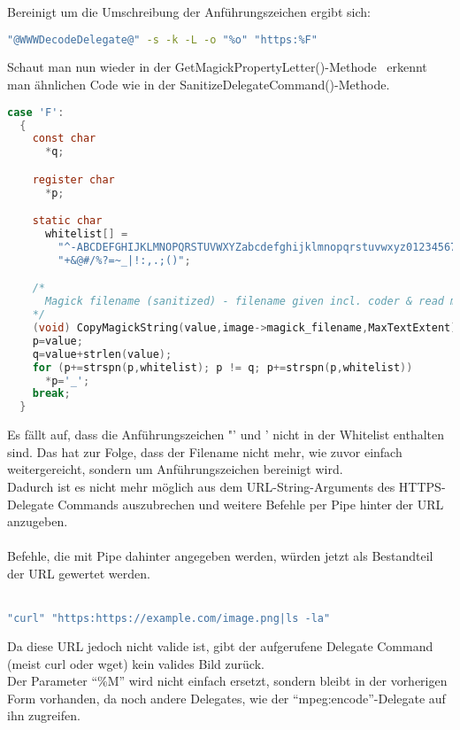 Bereinigt um die Umschreibung der Anführungszeichen ergibt sich:\\

\begin{lstlisting}[firstnumber=1, language=Bash, caption=Aufgelöster https-Delegate-Befehl 6.9.3-10,label={lst:lstlisting}]
"@WWWDecodeDelegate@" -s -k -L -o "%o" "https:%F"
\end{lstlisting}
\vspace{5mm}

\newpage

Schaut man nun wieder in der GetMagickPropertyLetter()-Methode~\cite{ComareFParam} erkennt man ähnlichen Code wie in der SanitizeDelegateCommand()-Methode.

\begin{lstlisting}[firstnumber=2610, language=C, caption=magick/property.c Gefilterte Wietergabe F-Parameter,label={lst:lstlisting}]
  case 'F':
  {
    const char
      *q;

    register char
      *p;

    static char
      whitelist[] =
        "^-ABCDEFGHIJKLMNOPQRSTUVWXYZabcdefghijklmnopqrstuvwxyz0123456789"
        "+&@#/%?=~_|!:,.;()";

    /*
      Magick filename (sanitized) - filename given incl. coder & read mods.
    */
    (void) CopyMagickString(value,image->magick_filename,MaxTextExtent);
    p=value;
    q=value+strlen(value);
    for (p+=strspn(p,whitelist); p != q; p+=strspn(p,whitelist))
      *p='_';
    break;
  }
\end{lstlisting}
\vspace{5mm}

Es fällt auf, dass die Anführungszeichen "' und ' nicht in der Whitelist enthalten sind.
Das hat zur Folge, dass der Filename nicht mehr, wie zuvor einfach weitergereicht, sondern um Anführungszeichen bereinigt wird.\\

Dadurch ist es nicht mehr möglich aus dem URL-String-Arguments des HTTPS-Delegate Commands auszubrechen und weitere Befehle per Pipe hinter der URL anzugeben.\\\\
Befehle, die mit Pipe dahinter angegeben werden, würden jetzt als Bestandteil der URL gewertet werden.\\\\

\begin{lstlisting}[language=Bash, caption=Vereinfachtes Beispiel für HTTPS Delegate-Command nach dem Ersetzen der Platzhalter,label={lst:simpleexampleafter}]
"curl" "https:https://example.com/image.png|ls -la"
\end{lstlisting}
\vspace{5mm}

Da diese URL jedoch nicht valide ist, gibt der aufgerufene Delegate Command (meist curl oder wget) kein valides Bild zurück.\\

Der Parameter "`\%M"' wird nicht einfach ersetzt, sondern bleibt in der vorherigen Form vorhanden, da noch andere Delegates, wie der "`mpeg:encode"'-Delegate auf ihn zugreifen.\\